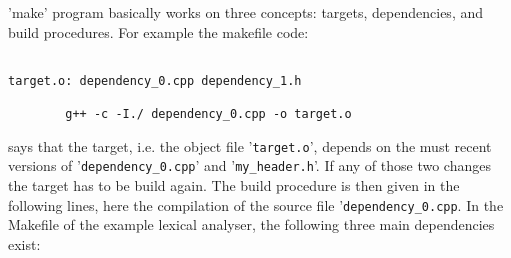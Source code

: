  'make' program
basically works on three concepts: targets, dependencies, and build
procedures. For example the makefile code:
\begin{lstlisting}

target.o: dependency_0.cpp dependency_1.h

        g++ -c -I./ dependency_0.cpp -o target.o

\end{lstlisting}
says that the target, i.e. the object file '{\tt target.o}', depends on the
must recent versions of '{\tt dependency_0.cpp}' and '{\tt my_header.h}'.  If
any of those two changes the target has to be build again. The build procedure
is then given in the following lines, here the compilation of the source file
'{\tt dependency_0.cpp}. In the Makefile of the example lexical analyser, the
following three main dependencies exist:
